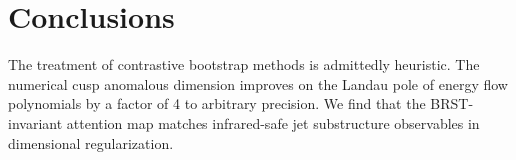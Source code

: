 \section{Conclusions}\label{sec:conclusions}

The treatment of contrastive bootstrap methods is admittedly heuristic.
The numerical cusp anomalous dimension improves on the Landau pole of
energy flow polynomials by a factor of 4 to arbitrary precision. We find
that the BRST-invariant attention map matches infrared-safe jet
substructure observables in dimensional regularization.

